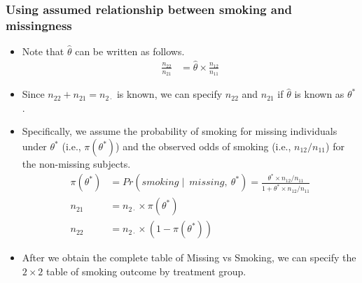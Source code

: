 \documentclass{beamer}
\begin{document}
\begin{frame}
\frametitle{Using assumed relationship between smoking and missingness}
\begin{itemize}
\item Note that $\hat\theta$ can be written as follows.
\begin{align}
\frac{n_{22}}{n_{21}} &= \hat\theta\times\frac{n_{12}}{n_{11}}
\end{align}
\item Since $n_{22} + n_{21} = n_{2\cdot}$ is known, we can specify $n_{22}$ and $n_{21}$ if $\hat\theta$ is known as $\theta^*$. 
\vspace{10pt}
\item Specifically, we assume the probability of smoking for missing individuals under $\theta^*$ (i.e., $\pi(\theta^*)$) and the observed odds of smoking (i.e., $n_{12}/n_{11}$) for the non-missing subjects.
\begin{align}\label{eq1}
\pi(\theta^*) &= Pr(smoking\mid~missing,~\theta^*) = \frac{\theta^*\times n_{12}/n_{11}}{1 + \theta^*\times n_{12}/n_{11}}\\
n_{21} &= n_{2\cdot}\times \pi(\theta^*) \nonumber\\
n_{22} &=  n_{2\cdot}\times (1 - \pi(\theta^*) )  \nonumber
\end{align}
\item After we obtain the complete table of Missing vs Smoking, we can specify the $2\times 2$ table of smoking outcome by treatment group.
\end{itemize}
\end{frame}
\end{document}
